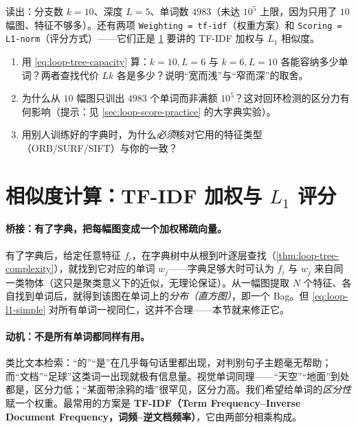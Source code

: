 \noindent 读出：分支数 $k=10$、深度 $L=5$、单词数 $4983$（未达 $10^5$ 上限，因为只用了 $10$ 幅图、特征不够多）。还有两项 \verb|Weighting = tf-idf|（权重方案）和 \verb|Scoring = L1-norm|（评分方式）——它们正是 \cref{sec:loop-score} 要讲的 TF-IDF 加权与 $L_1$ 相似度。

\begin{practice}
\begin{enumerate}
  \item 用 \cref{eq:loop-tree-capacity} 算：$k=10,L=6$ 与 $k=6,L=10$ 各能容纳多少单词？两者查找代价 $Lk$ 各是多少？说明“宽而浅”与“窄而深”的取舍。
  \item 为什么从 $10$ 幅图只训出 $4983$ 个单词而非满额 $10^5$？这对回环检测的区分力有何影响（提示：见 \cref{sec:loop-score-practice} 的大字典实验）。
  \item 用别人训练好的字典时，为什么\emph{必须}核对它用的特征类型（ORB/SURF/SIFT）与你的一致？
\end{enumerate}
\end{practice}

\section{相似度计算：TF-IDF 加权与 \texorpdfstring{$L_1$}{L1} 评分}
\label{sec:loop-score}

\paragraph{桥接：有了字典，把每幅图变成一个加权稀疏向量。}
有了字典后，给定任意特征 $f_i$，在字典树中从根到叶逐层查找（\cref{thm:loop-tree-complexity}），就找到它对应的单词 $w_j$——字典足够大时可认为 $f_i$ 与 $w_j$ 来自同一类物体（这只是聚类意义下的近似，无理论保证）\cite{gaoxiang2019slam14}。从一幅图提取 $N$ 个特征、各自找到单词后，就得到该图在单词上的\emph{分布（直方图）}，即一个 Bag。但 \cref{eq:loop-l1-simple} 对所有单词一视同仁，这并不合理——本节就来修正它。

\paragraph{动机：不是所有单词都同样有用。}
类比文本检索\cite{gaoxiang2019slam14}：“的”“是”在几乎每句话里都出现，对判别句子主题毫无帮助；而“文档”“足球”这类词一出现就极有信息量。视觉单词同理——“天空”“地面”到处都是，区分力低；“某面带涂鸦的墙”很罕见，区分力高。我们希望给单词的\emph{区分性}赋一个权重。最常用的方案是 \textbf{TF-IDF（Term Frequency--Inverse Document Frequency，词频--逆文档频率）}\cite{sivic2003video}，它由两部分相乘构成。

